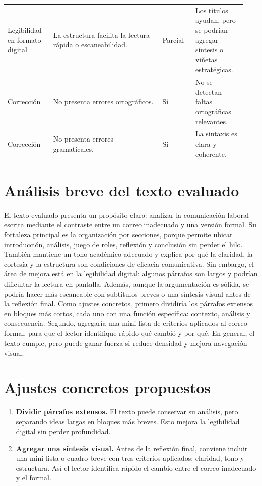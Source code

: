 \documentclass[
	spanish,
	letterpaper, oneside
]{article}
\begin{document}
\begin{longtable}{@{}p{0.18\linewidth}p{0.43\linewidth}p{0.13\linewidth}p{0.20\linewidth}@{}}
\addlinespace
Legibilidad en formato digital & La estructura facilita la lectura rápida o escaneabilidad. & Parcial & Los títulos ayudan, pero se podrían agregar síntesis o viñetas estratégicas. \\
\addlinespace
Corrección & No presenta errores ortográficos. & Sí & No se detectan faltas ortográficas relevantes. \\
\addlinespace
Corrección & No presenta errores gramaticales. & Sí & La sintaxis es clara y coherente. \\
\bottomrule
\end{longtable}

\section{Análisis breve del texto evaluado}

El texto evaluado presenta un propósito claro: analizar la comunicación laboral escrita mediante el contraste entre un correo inadecuado y una versión formal. Su fortaleza principal es la organización por secciones, porque permite ubicar introducción, análisis, juego de roles, reflexión y conclusión sin perder el hilo. También mantiene un tono académico adecuado y explica por qué la claridad, la cortesía y la estructura son condiciones de eficacia comunicativa. Sin embargo, el área de mejora está en la legibilidad digital: algunos párrafos son largos y podrían dificultar la lectura en pantalla. Además, aunque la argumentación es sólida, se podría hacer más escaneable con subtítulos breves o una síntesis visual antes de la reflexión final. Como ajustes concretos, primero dividiría los párrafos extensos en bloques más cortos, cada uno con una función específica: contexto, análisis y consecuencia. Segundo, agregaría una mini-lista de criterios aplicados al correo formal, para que el lector identifique rápido qué cambió y por qué. En general, el texto cumple, pero puede ganar fuerza si reduce densidad y mejora navegación visual.

\section{Ajustes concretos propuestos}

\begin{enumerate}
	\item \textbf{Dividir párrafos extensos.} El texto puede conservar su análisis, pero separando ideas largas en bloques más breves. Esto mejora la legibilidad digital sin perder profundidad.
	\item \textbf{Agregar una síntesis visual.} Antes de la reflexión final, conviene incluir una mini-lista o cuadro breve con tres criterios aplicados: claridad, tono y estructura. Así el lector identifica rápido el cambio entre el correo inadecuado y el formal.
\end{enumerate}
\end{document}
